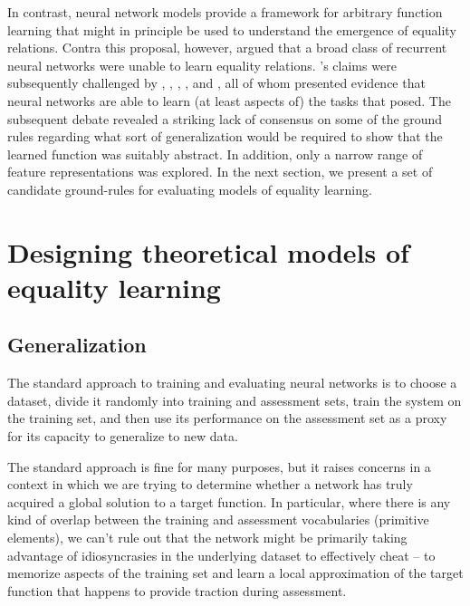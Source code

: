 \documentclass[9pt,twocolumn,twoside,lineno]{pnas-new}
\newcommand{\updatea}[1]{{\color{darkred}#1}}
\newcommand{\updateb}[1]{{\color{ourgreen}#1}}
\begin{document}
In contrast, neural network models provide a framework for arbitrary function learning that might in principle be used to understand the emergence of equality relations. Contra this proposal, however, \citet{marcus:1999} argued that a broad class of recurrent neural networks were unable to learn equality relations. \citeauthor{marcus:1999}'s claims were subsequently challenged by \citet{dienes:1999}, \citet{seidenberg:1999a}, \citet{seidenberg:1999b}, \citet{elman:1999}, and \citet{negishi:1999}, all of whom presented evidence that neural networks are able to learn (at least aspects of) the tasks that \citeauthor{marcus:1999} posed. \updatea{The subsequent debate \citep[reviewed in][]{alhama:2019} revealed a striking lack of consensus on some of the ground rules regarding what sort of generalization would be required to show that the learned function was suitably abstract. In addition, only a narrow range of feature representations was explored.} \updateb{In the next section, we present a set of candidate ground-rules for evaluating models of equality learning.}


\section*{Designing theoretical models of equality learning}


\subsection*{Generalization}

The standard approach to training and evaluating neural networks is to choose a dataset, divide it randomly into training and assessment sets, train the system on the training set, and then use its performance on the assessment set as a proxy for its capacity to generalize to new data.

The standard approach is fine for many purposes, but it raises concerns in a context in which we are trying to determine whether a network has truly acquired a global solution to a target function. In particular, where there is any kind of overlap between the training and assessment vocabularies (primitive elements), we can't rule out that the network might be primarily taking advantage of idiosyncrasies in the underlying dataset to effectively cheat -- to memorize aspects of the training set and learn a local approximation of the target function that happens to provide traction during assessment.
\end{document}
